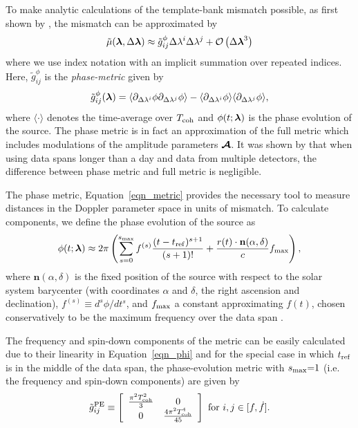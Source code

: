 \documentclass[aps, prd, twocolumn, superscriptaddress, floatfix, showpacs, nofootinbib, longbibliography]{revtex4-1}
\begin{document}
To make analytic calculations of the template-bank mismatch possible, as first shown by
\citet{brady1998}, the mismatch can be approximated by
\begin{equation}
\tilde{\mu}(\boldsymbol{\mathbf{\lambda}}, \Delta\boldsymbol{\mathbf{\lambda}}) \approx
\tilde{g}_{ij}^\phi \Delta\lambda^{i}\Delta\lambda^{j}
+ \mathcal{O}\left(\Delta\boldsymbol{\mathbf{\lambda}}^{3}\right)
\label{eqn_mutilde_expansion}
\end{equation}
where we use index notation with an implicit summation over repeated indices.
Here, $\tilde{g}_{ij}^{\phi}$ is the \emph{phase-metric} given by
\begin{align}
\tilde{g}_{ij}^\phi (\boldsymbol{\mathbf{\lambda}}) =
\langle
\partial_{\Delta\lambda^{i}}\phi
\partial_{\Delta\lambda^{j}}\phi
\rangle
-
\langle
\partial_{\Delta\lambda^{i}}\phi
\rangle
\langle
\partial_{\Delta\lambda^{j}}\phi
\rangle,
\label{eqn_metric}
\end{align}
where $\langle \cdot \rangle$ denotes the time-average over $T_{\rm coh}$ and
$\phi(t; \boldsymbol{\mathbf{\lambda}})$ is the phase evolution of the source. The phase metric is
in fact an approximation of the full metric which includes modulations of the
amplitude parameters $\boldsymbol{\mathcal{A}}$. It was shown by \citet{prix2007metric} that
when using data spans longer than a day and data from multiple detectors, the
difference between phase metric and full metric is negligible.

The phase metric, Equation~\eqref{eqn_metric} provides the necessary tool to
measure distances in the Doppler parameter space in units of mismatch. To
calculate components, we define the phase evolution
of the source as \citep{wette2015}
\begin{align}
\phi(t; \boldsymbol{\mathbf{\lambda}}) \approx 2\pi\left(
\sum_{s=0}^{s_{\textrm{max}}} f^{(s)}\frac{(t-t_{\rm ref})^{s+1}}{(s+1)!}
+ \frac{r(t)\cdot\mathbf{n}(\alpha, \delta)}{c} f_{\textrm{max}}\right),
\label{eqn_phi}
\end{align}
where $\mathbf{n}(\alpha, \delta)$ is the fixed position of the source with
respect to the solar system barycenter (with coordinates $\alpha$ and $\delta$,
the right ascension and declination), $f^{(s)}\equiv d^{s}\phi/dt^s$, and
$f_{\textrm{max}}$ a constant approximating $f(t)$, chosen conservatively to be the
maximum frequency over the data span \citep{wette2013}.

The frequency and spin-down components of the metric can be easily calculated
due to their linearity in Equation~\eqref{eqn_phi} and for the special case in
which $t_{\rm ref}$ is in the middle of the data span, the phase-evolution metric
with $s_{\textrm{max}}{=}1$ (i.e. the frequency and spin-down components) are given by
\begin{equation}
\tilde{g}^{\textrm{PE}}_{ij} \equiv
\left[
\begin{array}{cc}
\frac{\pi^{2}T_{\rm coh}^{2}}{3} & 0 \\
0 & \frac{4\pi^{2}T_{\rm coh}^{4}}{45}
\end{array}
\right]
\textrm{ for } i, j \in [f, \dot{f}].
\end{equation}
\end{document}
